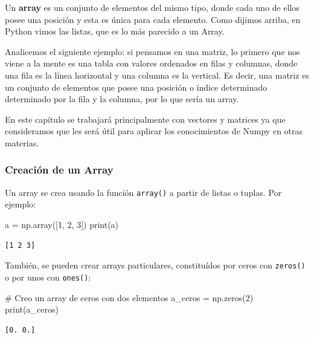 \documentclass[
  letterpaper,
  DIV=11,
  numbers=noendperiod]{scrreprt}
\newenvironment{Shaded}{\begin{snugshade}}{\end{snugshade}}
\newcommand{\BuiltInTok}[1]{\textcolor[rgb]{0.00,0.23,0.31}{#1}}
\newcommand{\CommentTok}[1]{\textcolor[rgb]{0.37,0.37,0.37}{#1}}
\newcommand{\DecValTok}[1]{\textcolor[rgb]{0.68,0.00,0.00}{#1}}
\newcommand{\NormalTok}[1]{\textcolor[rgb]{0.00,0.23,0.31}{#1}}
\newcommand{\OperatorTok}[1]{\textcolor[rgb]{0.37,0.37,0.37}{#1}}
\begin{document}
Un \textbf{array} es un conjunto de elementos del mismo tipo, donde cada
uno de ellos posee una posición y esta es única para cada elemento. Como
dijimos arriba, en Python vimos las listas, que es lo más parecido a un
Array.

Analicemos el siguiente ejemplo: si pensamos en una matriz, lo primero
que nos viene a la mente es una tabla con valores ordenados en filas y
columnas, donde una fila es la línea horizontal y una columna es la
vertical. Es decir, una matriz es un conjunto de elementos que posee una
posición o índice determinado determinado por la fila y la columna, por
lo que sería un array.

En este capítulo se trabajará principalmente con vectores y matrices ya
que consideramos que les será útil para aplicar los conocimientos de
Numpy en otras materias.

\subsubsection{Creación de un Array}\label{creaciuxf3n-de-un-array}

Un array se crea usando la función \texttt{array()} a partir de listas o
tuplas. Por ejemplo:

\begin{Shaded}
\begin{Highlighting}[]
\NormalTok{a }\OperatorTok{=}\NormalTok{ np.array([}\DecValTok{1}\NormalTok{, }\DecValTok{2}\NormalTok{, }\DecValTok{3}\NormalTok{])}
\BuiltInTok{print}\NormalTok{(a)}
\end{Highlighting}
\end{Shaded}

\begin{verbatim}
[1 2 3]
\end{verbatim}

También, se pueden crear arrays particulares, constituídos por ceros con
\texttt{zeros()} o por unos con \texttt{ones()}:

\begin{Shaded}
\begin{Highlighting}[]
\CommentTok{\# Creo un array de ceros con dos elementos}
\NormalTok{a\_ceros }\OperatorTok{=}\NormalTok{ np.zeros(}\DecValTok{2}\NormalTok{)}
\BuiltInTok{print}\NormalTok{(a\_ceros)}
\end{Highlighting}
\end{Shaded}

\begin{verbatim}
[0. 0.]
\end{verbatim}
\end{document}
